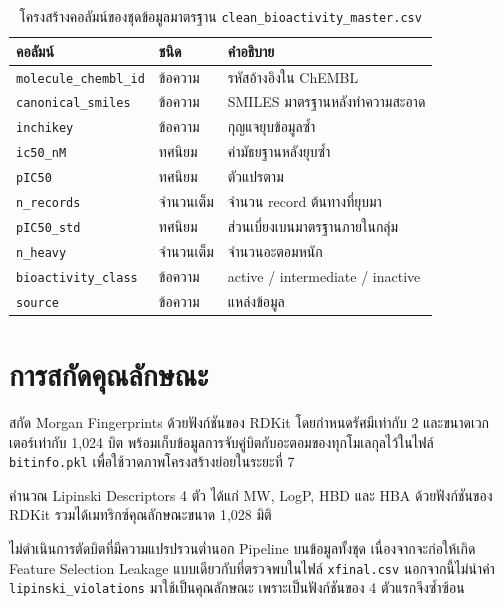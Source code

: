 \begin{table}[H]
\centering
\caption{โครงสร้างคอลัมน์ของชุดข้อมูลมาตรฐาน \texttt{clean\_bioactivity\_master.csv}}
\label{tab:masterschema}
\begin{tabular}{L{4.4cm} C{2.4cm} L{6.6cm}}
\toprule
\textbf{คอลัมน์} & \textbf{ชนิด} & \textbf{คำอธิบาย}\\
\midrule
\texttt{molecule\_chembl\_id} & ข้อความ & รหัสอ้างอิงใน ChEMBL\\
\texttt{canonical\_smiles} & ข้อความ & SMILES มาตรฐานหลังทำความสะอาด\\
\texttt{inchikey} & ข้อความ & กุญแจยุบข้อมูลซ้ำ\\
\texttt{ic50\_nM} & ทศนิยม & ค่ามัธยฐานหลังยุบซ้ำ\\
\texttt{pIC50} & ทศนิยม & ตัวแปรตาม\\
\texttt{n\_records} & จำนวนเต็ม & จำนวน record ต้นทางที่ยุบมา\\
\texttt{pIC50\_std} & ทศนิยม & ส่วนเบี่ยงเบนมาตรฐานภายในกลุ่ม\\
\texttt{n\_heavy} & จำนวนเต็ม & จำนวนอะตอมหนัก\\
\texttt{bioactivity\_class} & ข้อความ & active / intermediate / inactive\\
\texttt{source} & ข้อความ & แหล่งข้อมูล\\
\bottomrule
\end{tabular}
\end{table}

\section{การสกัดคุณลักษณะ}

สกัด Morgan Fingerprints ด้วยฟังก์ชันของ RDKit โดยกำหนดรัศมีเท่ากับ 2 และขนาดเวกเตอร์เท่ากับ 1{,}024 บิต พร้อมเก็บข้อมูลการจับคู่บิตกับอะตอมของทุกโมเลกุลไว้ในไฟล์ \texttt{bitinfo.pkl} เพื่อใช้วาดภาพโครงสร้างย่อยในระยะที่ 7

คำนวณ Lipinski Descriptors 4 ตัว ได้แก่ MW, LogP, HBD และ HBA ด้วยฟังก์ชันของ RDKit รวมได้เมทริกซ์คุณลักษณะขนาด 1{,}028 มิติ

\begin{warnnote}
ไม่ดำเนินการตัดบิตที่มีความแปรปรวนต่ำนอก Pipeline บนข้อมูลทั้งชุด เนื่องจากจะก่อให้เกิด Feature Selection Leakage แบบเดียวกับที่ตรวจพบในไฟล์ \texttt{xfinal.csv} นอกจากนี้ไม่นำค่า \texttt{lipinski\_violations} มาใช้เป็นคุณลักษณะ เพราะเป็นฟังก์ชันของ 4 ตัวแรกจึงซ้ำซ้อน
\end{warnnote}

